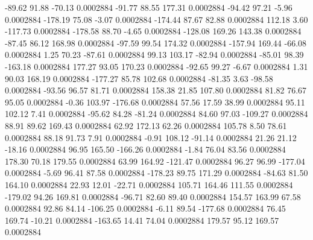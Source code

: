       -89.62       91.88      -70.13     0.0002884
      -91.77       88.55      177.31     0.0002884
      -94.42       97.21       -5.96     0.0002884
     -178.19       75.08       -3.07     0.0002884
     -174.44       87.67       82.88     0.0002884
      112.18        3.60     -117.73     0.0002884
     -178.58       88.70       -4.65     0.0002884
     -128.08      169.26      143.38     0.0002884
      -87.45       86.12      168.98     0.0002884
      -97.59       99.54      174.32     0.0002884
     -157.94      169.44      -66.08     0.0002884
        1.25       70.23      -87.61     0.0002884
       99.13      103.17      -82.94     0.0002884
      -85.01       98.39     -163.18     0.0002884
      177.27       93.05      170.23     0.0002884
      -92.65       99.27       -6.67     0.0002884
        1.31       90.03      168.19     0.0002884
     -177.27       85.78      102.68     0.0002884
      -81.35        3.63      -98.58     0.0002884
      -93.56       96.57       81.71     0.0002884
      158.38       21.85      107.80     0.0002884
       81.82       76.67       95.05     0.0002884
       -0.36      103.97     -176.68     0.0002884
       57.56       17.59       38.99     0.0002884
       95.11      102.12        7.41     0.0002884
      -95.62       84.28      -81.24     0.0002884
       84.60       97.03     -109.27     0.0002884
       88.91       89.62      169.43     0.0002884
       62.92      172.13       62.26     0.0002884
      105.78        8.50       78.61     0.0002884
       88.18       91.73        7.91     0.0002884
       -0.91      108.12      -91.14     0.0002884
       21.26       21.12      -18.16     0.0002884
       96.95      165.50     -166.26     0.0002884
       -1.84       76.04       83.56     0.0002884
      178.30       70.18      179.55     0.0002884
       63.99      164.92     -121.47     0.0002884
       96.27       96.99     -177.04     0.0002884
       -5.69       96.41       87.58     0.0002884
     -178.23       89.75      171.29     0.0002884
      -84.63       81.50      164.10     0.0002884
       22.93       12.01      -22.71     0.0002884
      105.71      164.46      111.55     0.0002884
     -179.02       94.26      169.81     0.0002884
      -96.71       82.60       89.40     0.0002884
      154.57      163.99       67.58     0.0002884
       92.86       84.14     -106.25     0.0002884
       -6.11       89.54     -177.68     0.0002884
       76.45      169.74      -10.21     0.0002884
     -163.65       14.41       74.04     0.0002884
      179.57       95.12      169.57     0.0002884
